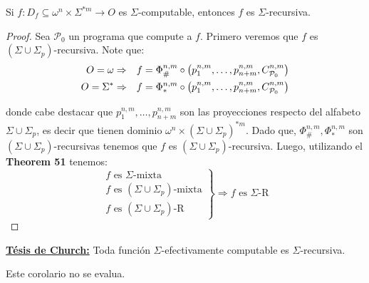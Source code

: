   \pagebreak
  \begin{corollary}
    \PN Si $f: D_{f} \subseteq \omega^{n} \times \Sigma^{\ast m} \rightarrow O$ es $\Sigma$-computable, entonces $f$ es
    $\Sigma$-recursiva.
  \end{corollary}
  \begin{proof}
    \PN Sea $\mathcal{P}_{0}$ un programa que compute a $f$. Primero veremos que $f$ es $(\Sigma \cup
    \Sigma_{p})$-recursiva. Note que:
    \begin{eqnarray*}
      O = \omega &\Rightarrow& f = \Phi_{\#}^{n,m} \circ \left(p_{1}^{n,m},\dotsc,p_{n+m}^{n,m},
        C_{\mathcal{P}_{0}}^{n,m}\right) \\
      O = \Sigma^{\ast} &\Rightarrow& f = \Phi_{\ast}^{n,m} \circ \left(p_{1}^{n,m},\dotsc,p_{n+m}^{n,m},
        C_{\mathcal{P}_{0}}^{n,m}\right)
    \end{eqnarray*}

    \PN donde cabe destacar que $p_{1}^{n,m},\dotsc,p_{n+m}^{n,m}$ son las proyecciones respecto del alfabeto $\Sigma
    \cup \Sigma_{p}$, es decir que tienen dominio $\omega^{n} \times (\Sigma \cup \Sigma_{p})^{\ast m}$. Dado que,
    $\Phi_{\#}^{n,m}, \Phi_{\ast}^{n,m}$ son $(\Sigma \cup \Sigma_{p})$-recursivas tenemos que $f$ es $(\Sigma \cup
    \Sigma_{p})$-recursiva. Luego, utilizando el \textbf{Theorem 51} tenemos:
    \begin{equation*}
		  	\left.
		  	\begin{array}{l}
          f \text{ es } \Sigma\text{-mixta} \\
          f \text{ es } (\Sigma \cup \Sigma_{p})\text{-mixta} \\
          f \text{ es } (\Sigma \cup \Sigma_{p})\text{-R}
		  	\end{array}
		  	\right\rbrace
        \Rightarrow f \text{ es } \Sigma\text{-R}
		\end{equation*}
  \end{proof}

  \PN \textbf{\underline{Tésis de Church:}} Toda función $\Sigma$-efectivamente computable es $\Sigma$-recursiva.

  \begin{corollary}
    \PN Este corolario no se evalua.
  \end{corollary}


